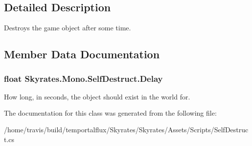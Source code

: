 \subsection{Detailed Description}
Destroys the game object after some time. 



\subsection{Member Data Documentation}
\hypertarget{class_skyrates_1_1_mono_1_1_self_destruct_a922acaf93a559878b519ec239e050915}{
\subsubsection[{Delay}]{\setlength{\rightskip}{0pt plus 5cm}float Skyrates.\-Mono.\-Self\-Destruct.\-Delay}}\label{class_skyrates_1_1_mono_1_1_self_destruct_a922acaf93a559878b519ec239e050915}


How long, in seconds, the object should exist in the world for. 



The documentation for this class was generated from the following file\-:\begin{DoxyCompactItemize}
\item 
/home/travis/build/temportalflux/\-Skyrates/\-Skyrates/\-Assets/\-Scripts/Self\-Destruct.\-cs\end{DoxyCompactItemize}
